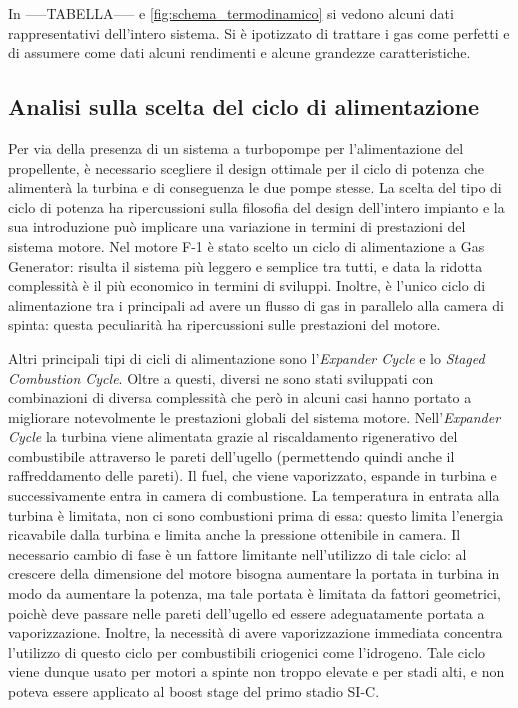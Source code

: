 In -----TABELLA----- e \autoref{fig:schema_termodinamico} si vedono alcuni dati rappresentativi dell'intero sistema. Si è ipotizzato di trattare i gas come perfetti e di assumere come dati alcuni rendimenti e alcune grandezze caratteristiche.


\subsection{Analisi sulla scelta del ciclo di alimentazione}
\label{subsec:analisi ciclo alimentazione}

Per via della presenza di un sistema a turbopompe per l'alimentazione del propellente, è necessario scegliere il design ottimale per il ciclo di potenza che alimenterà la turbina e di conseguenza le due pompe stesse.
La scelta del tipo di ciclo di potenza ha ripercussioni sulla filosofia del design dell'intero impianto e la sua introduzione può implicare una variazione in termini di prestazioni del sistema motore.
Nel motore F-1 è stato scelto un ciclo di alimentazione a Gas Generator: risulta il sistema più leggero e semplice tra tutti, e data la ridotta complessità è il più economico in termini di sviluppi.
Inoltre, è l'unico ciclo di alimentazione tra i principali ad avere un flusso di gas in parallelo alla camera di spinta: questa peculiarità ha ripercussioni sulle prestazioni del motore.

Altri principali tipi di cicli di alimentazione sono l'\textit{Expander Cycle} e lo \textit{Staged Combustion Cycle}. Oltre a questi, diversi ne sono stati sviluppati con combinazioni di diversa complessità che però in alcuni casi hanno portato a migliorare notevolmente le prestazioni globali del sistema motore.
Nell'\textit{Expander Cycle} la turbina viene alimentata grazie al riscaldamento rigenerativo del combustibile attraverso le pareti dell'ugello (permettendo quindi anche il raffreddamento delle pareti).
Il fuel, che viene vaporizzato, espande in turbina e successivamente entra in camera di combustione. La temperatura in entrata alla turbina è limitata, non ci sono combustioni prima di essa: questo limita l'energia ricavabile dalla turbina e limita anche la pressione ottenibile in camera.
Il necessario cambio di fase è un fattore limitante nell'utilizzo di tale ciclo: al crescere della dimensione del motore bisogna aumentare la portata in turbina in modo da aumentare la potenza, ma tale portata è limitata da fattori geometrici, poichè deve passare nelle pareti dell'ugello ed essere adeguatamente portata a vaporizzazione.
Inoltre, la necessità di avere vaporizzazione immediata concentra l'utilizzo di questo ciclo per combustibili criogenici come l'idrogeno. Tale ciclo viene dunque usato per motori a spinte non troppo elevate e per stadi alti, e non poteva essere applicato al boost stage del primo stadio SI-C.

